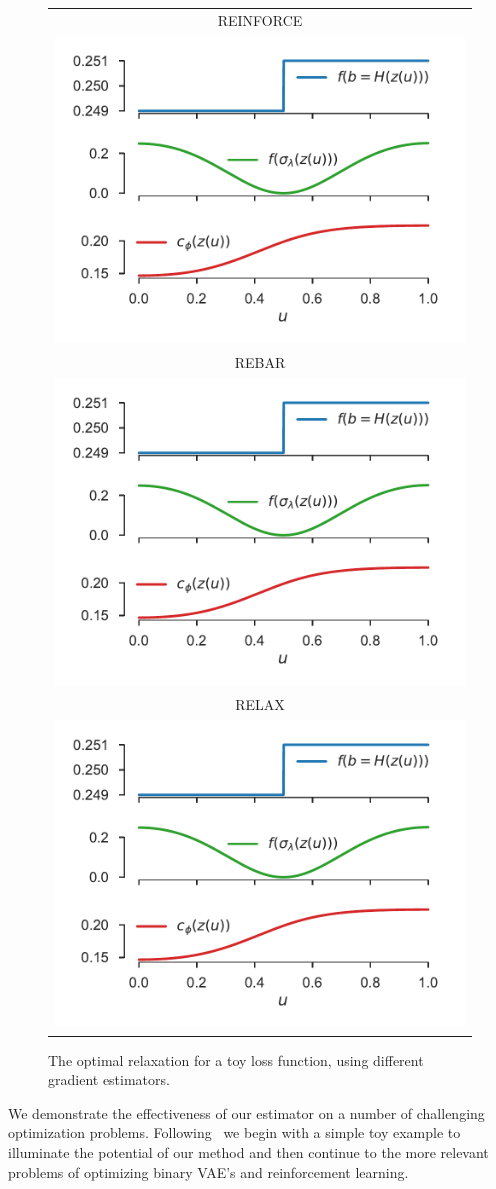\documentclass{article}
\newcommand{\E}{\mathbb{E}}
\begin{document}
\begin{figure}
\centering
\vspace{-10mm}
\begin{tabular}{c}
REINFORCE\\
\hspace{-3mm}\includegraphics[width=0.50\columnwidth, clip, trim=0.5cm 8cm 0.8cm 0.5cm]{figures/relaxations_t_499_which_2}\\
REBAR\\
\hspace{-3mm}\includegraphics[width=0.50\columnwidth, clip, trim=0.5cm 5cm 0.8cm 3.9cm]{figures/relaxations_t_499_which_2}\\
RELAX\\
\hspace{-3mm}\includegraphics[width=0.50\columnwidth, clip, trim=0.5cm 0cm 0.8cm 7.2cm]{figures/relaxations_t_499_which_2}
\end{tabular}
\vspace*{-6mm}
\caption{The optimal relaxation for a toy loss function, using different gradient estimators.}
\label{learned-relaxations}
\end{figure}
%
We demonstrate the effectiveness of our estimator on a number of challenging optimization problems. Following~\citet{tucker2017rebar} we begin with a simple toy example to illuminate the potential of our method and then continue to the more relevant problems of optimizing binary VAE's and reinforcement learning.
\end{document}
